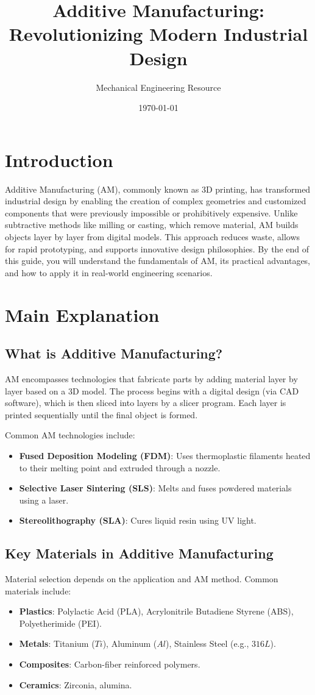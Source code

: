 \documentclass[12pt]{article}
\title{Additive Manufacturing: Revolutionizing Modern Industrial Design}
\author{Mechanical Engineering Resource}
\date{\today}
\begin{document}
\section*{Introduction}
Additive Manufacturing (AM), commonly known as 3D printing, has transformed industrial design by enabling the creation of complex geometries and customized components that were previously impossible or prohibitively expensive. Unlike subtractive methods like milling or casting, which remove material, AM builds objects layer by layer from digital models. This approach reduces waste, allows for rapid prototyping, and supports innovative design philosophies. By the end of this guide, you will understand the fundamentals of AM, its practical advantages, and how to apply it in real-world engineering scenarios. 

\section{Main Explanation}

\subsection{What is Additive Manufacturing?}
AM encompasses technologies that fabricate parts by adding material layer by layer based on a 3D model. The process begins with a digital design (via CAD software), which is then sliced into layers by a slicer program. Each layer is printed sequentially until the final object is formed. 

Common AM technologies include:
\begin{itemize}
    \item \textbf{Fused Deposition Modeling (FDM)}: Uses thermoplastic filaments heated to their melting point and extruded through a nozzle.
    \item \textbf{Selective Laser Sintering (SLS)}: Melts and fuses powdered materials using a laser.
    \item \textbf{Stereolithography (SLA)}: Cures liquid resin using UV light.
\end{itemize}

\subsection{Key Materials in Additive Manufacturing}
Material selection depends on the application and AM method. Common materials include:
\begin{itemize}
    \item \textbf{Plastics}: Polylactic Acid (PLA), Acrylonitrile Butadiene Styrene (ABS), Polyetherimide (PEI).
    \item \textbf{Metals}: Titanium ($Ti$), Aluminum ($Al$), Stainless Steel (e.g., $316L$).
    \item \textbf{Composites}: Carbon-fiber reinforced polymers.
    \item \textbf{Ceramics}: Zirconia, alumina.
\end{itemize}
\end{document}
